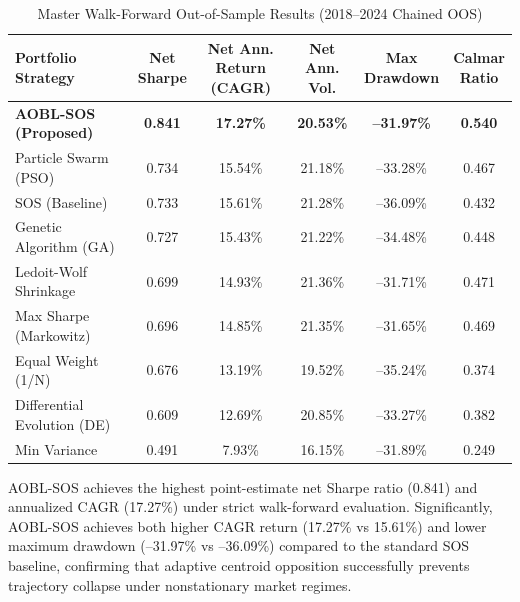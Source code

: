 \documentclass[11pt,a4paper]{article}
\begin{document}
\begin{table}[htbp]
\centering
\caption{Master Walk-Forward Out-of-Sample Results (2018--2024 Chained OOS)}
\label{tab:master_wf}
\begin{tabular}{lccccc}
\toprule
\textbf{Portfolio Strategy} &
\makecell{\textbf{Net}\\\textbf{Sharpe}} &
\makecell{\textbf{Net Ann.}\\\textbf{Return (CAGR)}} &
\makecell{\textbf{Net Ann.}\\\textbf{Vol.}} &
\makecell{\textbf{Max}\\\textbf{Drawdown}} &
\makecell{\textbf{Calmar}\\\textbf{Ratio}} \\
\midrule
\textbf{AOBL-SOS (Proposed)} & \textbf{0.841} & \textbf{17.27\%} & \textbf{20.53\%} & \textbf{--31.97\%} & \textbf{0.540} \\
Particle Swarm (PSO) & 0.734 & 15.54\% & 21.18\% & --33.28\% & 0.467 \\
SOS (Baseline) & 0.733 & 15.61\% & 21.28\% & --36.09\% & 0.432 \\
Genetic Algorithm (GA) & 0.727 & 15.43\% & 21.22\% & --34.48\% & 0.448 \\
Ledoit-Wolf Shrinkage & 0.699 & 14.93\% & 21.36\% & --31.71\% & 0.471 \\
Max Sharpe (Markowitz) & 0.696 & 14.85\% & 21.35\% & --31.65\% & 0.469 \\
Equal Weight (1/N) & 0.676 & 13.19\% & 19.52\% & --35.24\% & 0.374 \\
Differential Evolution (DE) & 0.609 & 12.69\% & 20.85\% & --33.27\% & 0.382 \\
Min Variance & 0.491 & 7.93\% & 16.15\% & --31.89\% & 0.249 \\
\bottomrule
\end{tabular}
\end{table}

AOBL-SOS achieves the highest point-estimate net Sharpe ratio (0.841) and annualized CAGR (17.27\%) under strict walk-forward evaluation. Significantly, AOBL-SOS achieves both higher CAGR return (17.27\% vs 15.61\%) and lower maximum drawdown (--31.97\% vs --36.09\%) compared to the standard SOS baseline, confirming that adaptive centroid opposition successfully prevents trajectory collapse under nonstationary market regimes.
\end{document}
